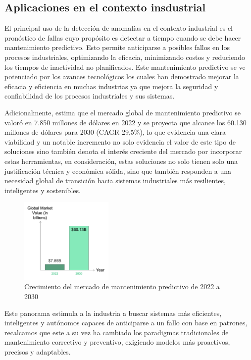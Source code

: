 \documentclass[11pt,a4paper,spanish]{book}
\numberwithin{equation}{chapter}
\numberwithin{figure}{chapter}
\begin{document}
\subsection{Aplicaciones en el contexto insdustrial} 

El principal uso de la detección de anomalías en el contexto industrial es el pronóstico de fallas cuyo propósito es detectar a tiempo cuando se debe hacer mantenimiento predictivo. Esto permite anticiparse a posibles fallos en los procesos industriales, optimizando la eficacia, minimizando costos y reduciendo los tiempos de inactividad no planificados. Este mantenimiento predictivo se ve potenciado por los avances tecnológicos los cuales han demostrado mejorar la eficacia y eficiencia en muchas industrias ya que mejora la seguridad y confiabilidad de los procesos industriales y sus sistemas.


Adicionalmente, \cite{worktrek2023predictive} estima que el mercado global de mantenimiento predictivo se valoró en 7.850 millones de dólares en 2022 y se proyecta que alcance los 60.130 millones de dólares para 2030 (CAGR 29,5\%), lo que evidencia una clara viabilidad y un notable incremento no solo evidencia el valor de este tipo de soluciones sino también denota el interés creciente del mercado por incorporar estas herramientas, en consideración, estas soluciones no solo tienen solo una  justificación técnica y económica sólida, sino que también responden a una necesidad global de transición hacia sistemas industriales más resilientes, inteligentes y sostenibles.


\begin{figure}[h]
    \centering
    \includegraphics[width=0.4\textwidth]{media/worktrek.png}
    \caption{Crecimiento del mercado de mantenimiento predictivo de 2022 a 2030  \protect\cite{worktrek2023predictive}}
    \label{fig:figWorkTrek}
\end{figure}


Este panorama estimula a la industria a buscar sistemas más eficientes, inteligentes y autónomos capaces de anticiparse a un fallo con base en patrones, recalcamos que este a su vez ha cambiado los paradigmas tradicionales de mantenimiento correctivo y preventivo, exigiendo modelos más proactivos, precisos y adaptables.
\end{document}
